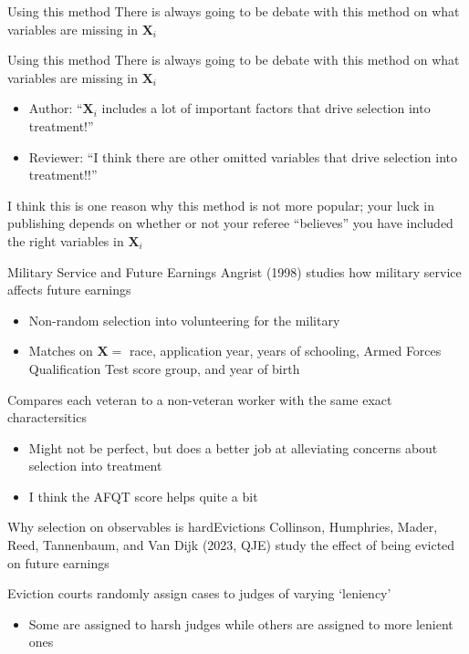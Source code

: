 \documentclass[aspectratio=169,t,11pt,table]{beamer}
\begin{document}
\begin{frame}{Using this method}
  There is always going to be debate with this method on what variables are missing in $\bm{X}_i$
\end{frame}


\begin{frame}{Using this method}
  There is always going to be debate with this method on what variables are missing in $\bm{X}_i$
  \begin{itemize}
    \item Author: ``$\bm{X}_i$ includes a lot of important factors that drive selection into treatment!''
    \item Reviewer: ``I think there are other omitted variables that drive selection into treatment!!''
  \end{itemize}

  \bigskip
  I think this is one reason why this method is not more popular; your luck in publishing depends on whether or not your referee ``believes'' you have included the right variables in $\bm{X}_i$
\end{frame}

\begin{frame}{Military Service and Future Earnings}
  Angrist (1998) studies how military service affects future earnings
  \begin{itemize}
    \item Non-random selection into volunteering for the military
    \item Matches on $\bm{X} = $ race, application year, years of schooling, Armed Forces Qualification Test score group, and year of birth
  \end{itemize}

  \bigskip
  Compares each veteran to a non-veteran worker with the same exact charactersitics
  \pause
  \begin{itemize}
    \item Might not be perfect, but does a better job at alleviating concerns about selection into treatment
    \item I think the AFQT score helps quite a bit
  \end{itemize}
\end{frame}

\begin{frame}{Why selection on observables is hard}{Evictions}
  Collinson, Humphries, Mader, Reed, Tannenbaum, and Van Dijk (2023, QJE) study the effect of being evicted on future earnings

  \bigskip
  Eviction courts randomly assign cases to judges of varying `leniency'
  \begin{itemize}
    \item Some are assigned to harsh judges while others are assigned to more lenient ones
  \end{itemize}
\end{frame}
\end{document}
